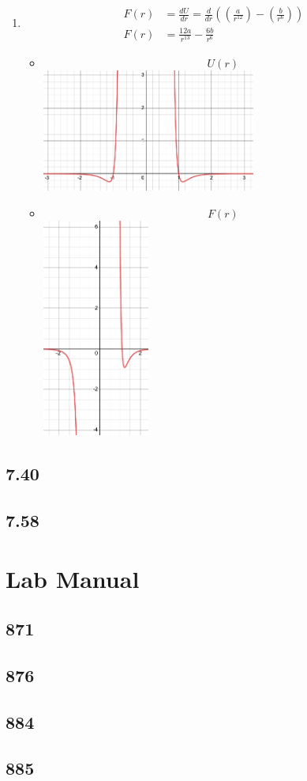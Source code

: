 \documentclass{article}
\begin{document}
\begin{enumerate}[label = \textbf{(\alph*)}]
	\item
		\begin{align*}
			F(r) & = \frac{dU}{dr} = \frac{d}{dr} \left( \left( \frac{a}{r^{12}} \right) - \left( \frac{b}{r^6} \right) \right) \\
			F(r) & = \frac{12a}{r^{13}} - \frac{6b}{r^6}
		\end{align*}
		\begin{itemize}
			\item $$ U(r) $$
				\includegraphics[width = 200pt]{graph_1.png}
			\item $$ F(r) $$
				\includegraphics[width = 100pt]{graph_2.png}
		\end{itemize}
\end{enumerate}

\subsection{7.40}

\subsection{7.58}

\section{Lab Manual}

\subsection{871}

\subsection{876}

\subsection{884}

\subsection{885}
\end{document}
